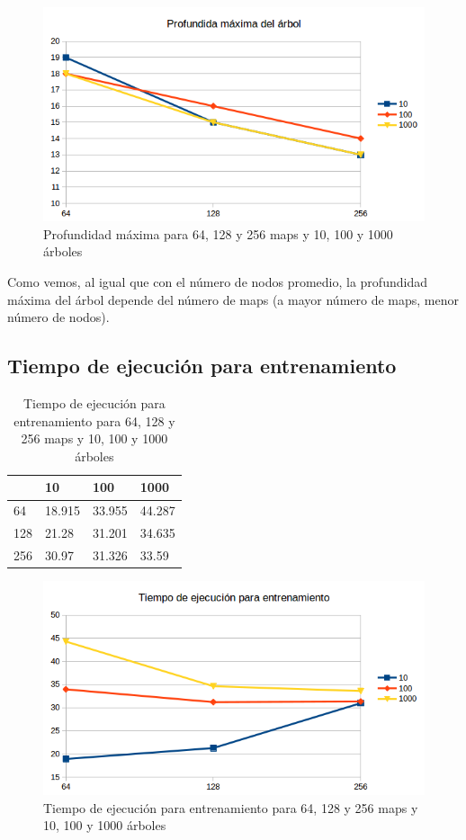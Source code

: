 \begin{figure}[H]
	\centering
	\includegraphics[width=12cm]{img/profundidad-maxima}
	\caption{Profundidad máxima para 64, 128 y 256 maps y 10, 100 y 1000 árboles}
	\label{fig:profundidad-maxima}
\end{figure}

Como vemos, al igual que con el número de nodos promedio, la profundidad máxima del árbol depende del número de maps (a mayor número de maps, menor número de nodos).

\newpage
\subsection{Tiempo de ejecución para entrenamiento}

\begin{table}[H]
	\centering
	\caption{Tiempo de ejecución para entrenamiento para 64, 128 y 256 maps y 10, 100 y 1000 árboles}
	\label{tab:tiempo-entrenamiento}
	\begin{tabular}{l|lll|}
		\cline{2-4}
		& 10    & 100    & 1000    \\ \hline
		\multicolumn{1}{|l|}{64}  & 18.915 & 33.955 & 44.287 \\
		\multicolumn{1}{|l|}{128} & 21.28  & 31.201 & 34.635 \\
		\multicolumn{1}{|l|}{256} & 30.97  & 31.326 & 33.59  \\ \hline
	\end{tabular}
\end{table}

\begin{figure}[H]
	\centering
	\includegraphics[width=12cm]{img/tiempo-entrenamiento}
	\caption{Tiempo de ejecución para entrenamiento para 64, 128 y 256 maps y 10, 100 y 1000 árboles}
	\label{fig:tiempo-entrenamiento}
\end{figure}

